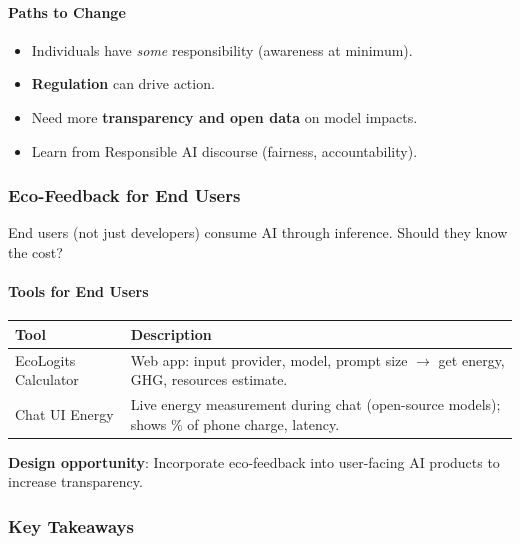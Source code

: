\paragraph*{Paths to Change}
\begin{itemize}
  \item Individuals have \textit{some} responsibility (awareness at minimum).
  \item \textbf{Regulation} can drive action.
  \item Need more \textbf{transparency and open data} on model impacts.
  \item Learn from Responsible AI discourse (fairness, accountability).
\end{itemize}

\subsubsection*{Eco-Feedback for End Users}

End users (not just developers) consume AI through inference. Should they know the cost?

\paragraph*{Tools for End Users}

\begin{center}
\renewcommand{\arraystretch}{1.3}
\begin{tabular}{@{} l p{8cm} @{}}
\toprule
\textbf{Tool} & \textbf{Description} \\
\midrule
EcoLogits Calculator & Web app: input provider, model, prompt size $\to$ get energy, GHG, resources estimate. \\
Chat UI Energy & Live energy measurement during chat (open-source models); shows \% of phone charge, latency. \\
\bottomrule
\end{tabular}
\end{center}

\textbf{Design opportunity}: Incorporate eco-feedback into user-facing AI products to increase transparency.

\subsubsection*{Key Takeaways}

